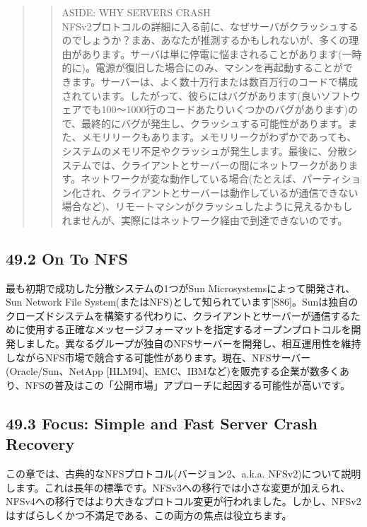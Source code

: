 \begin{quote}
\begin{quote}
ASIDE: WHY SERVERS CRASH\\
NFSv2プロトコルの詳細に入る前に、なぜサーバがクラッシュするのでしょうか？まあ、あなたが推測するかもしれないが、多くの理由があります。サーバは単に停電に悩まされることがあります(一時的に)。電源が復旧した場合にのみ、マシンを再起動することができます。サーバーは、よく数十万行または数百万行のコードで構成されています。したがって、彼らにはバグがあります(良いソフトウェアでも100〜1000行のコードあたりいくつかのバグがあります)ので、最終的にバグが発生し、クラッシュする可能性があります。また、メモリリークもあります。メモリリークがわずかであっても、システムのメモリ不足やクラッシュが発生します。最後に、分散システムでは、クライアントとサーバーの間にネットワークがあります。ネットワークが変な動作している場合(たとえば、パーティション化され、クライアントとサーバーは動作しているが通信できない場合など)、リモートマシンがクラッシュしたように見えるかもしれませんが、実際にはネットワーク経由で到達できないのです。
\end{quote}
\end{quote}

\hypertarget{on-to-nfs}{%
\subsection*{49.2 On To NFS}\label{on-to-nfs}}

最も初期で成功した分散システムの1つがSun
Microsystemsによって開発され、Sun Network File
System(またはNFS)として知られています{[}S86{]}。Sunは独自のクローズドシステムを構築する代わりに、クライアントとサーバーが通信するために使用する正確なメッセージフォーマットを指定するオープンプロトコルを開発しました。異なるグループが独自のNFSサーバーを開発し、相互運用性を維持しながらNFS市場で競合する可能性があります。現在、NFSサーバー(Oracle/Sun、NetApp
{[}HLM94{]}、EMC、IBMなど)を販売する企業が数多くあり、NFSの普及はこの「公開市場」アプローチに起因する可能性が高いです。

\hypertarget{focus-simple-and-fast-server-crash-recovery}{%
\subsection*{49.3 Focus: Simple and Fast Server Crash
Recovery}\label{focus-simple-and-fast-server-crash-recovery}}

この章では、古典的なNFSプロトコル(バージョン2、a.k.a.
NFSv2)について説明します。これは長年の標準です。NFSv3への移行では小さな変更が加えられ、NFSv4への移行ではより大きなプロトコル変更が行われました。しかし、NFSv2はすばらしくかつ不満足である、この両方の焦点は役立ちます。

